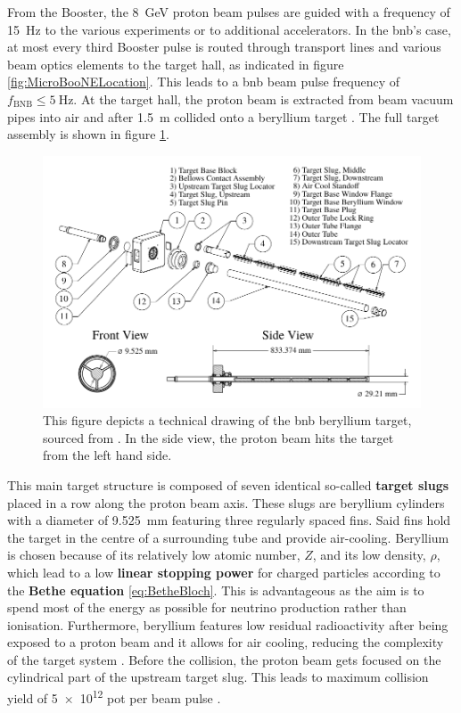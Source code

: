 From the Booster, the \SI{8}{\giga\electronvolt} proton beam pulses are guided with a frequency of \SI{15}{\hertz} to the various experiments or to additional accelerators. In the \gls{bnb}'s case, at most every third Booster pulse is routed through transport lines and various beam optics elements to the target hall, as indicated in figure \ref{fig:MicroBooNELocation}. This leads to a \gls{bnb} beam pulse frequency of $f_\text{BNB} \leq \SI{5}{\hertz}$. At the target hall, the proton beam is extracted from beam vacuum pipes into air and after \SI{1.5}{\metre} collided onto a beryllium target \cite{BNBBeamFlux}. The full target assembly is shown in figure \ref{fig:BNBTarget}.
\begin{figure}[htbp]
    \centering
    \includegraphics[width=1.0\textwidth]{images/MicroBooNE/BNBTarget.pdf}
    \caption[Technical Drawing of the BNB Target]{This figure depicts a technical drawing of the \gls{bnb} beryllium target, sourced from \cite{BNBBeamFlux}. In the side view, the proton beam hits the target from the left hand side.}
    \label{fig:BNBTarget}
\end{figure}
This main target structure is composed of seven identical so-called \textbf{target slugs} placed in a row along the proton beam axis. These slugs are beryllium cylinders with a diameter of \SI{9.525}{\milli\metre} featuring three regularly spaced fins. Said fins hold the target in the centre of a surrounding tube and provide air-cooling. Beryllium is chosen because of its relatively low atomic number, $Z$, and its low density, $\rho$, which lead to a low \textbf{linear stopping power} for charged particles according to the \textbf{Bethe equation} \ref{eq:BetheBloch}. This is advantageous as the aim is to spend most of the energy as possible for neutrino production rather than ionisation. Furthermore, beryllium features low residual radioactivity after being exposed to a proton beam and it allows for air cooling, reducing the complexity of the target system \cite{BNBBeamFlux}. Before the collision, the proton beam gets focused on the cylindrical part of the upstream target slug. This leads to maximum collision yield of \num{5e12} \gls{pot} per beam pulse \cite{BNBBeamFlux}. 

